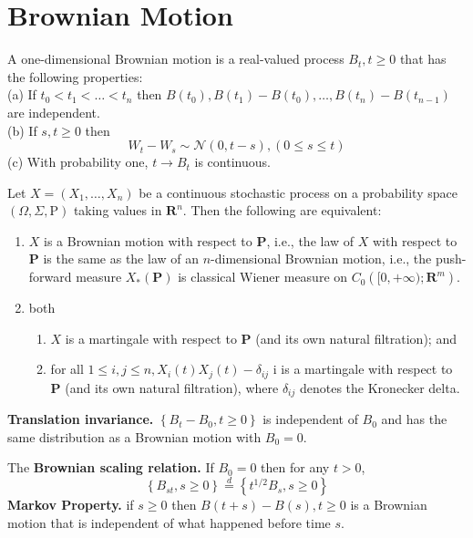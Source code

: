 
\section{Brownian Motion}
\begin{definition}
	A one-dimensional Brownian motion is a real-valued process $B_t, t \geq 0$ that has the following properties:\\
(a) If $t_0<t_1<\ldots<t_n$ then $B\left(t_0\right), B\left(t_1\right)-B\left(t_0\right), \ldots, B\left(t_n\right)-B\left(t_{n-1}\right)$ are independent.\\
(b) If $s, t \geq 0$ then
\[
W_t-W_s \sim \mathcal{N}(0, t-s),(0 \leq s \leq t)
\]
(c) With probability one, $t \rightarrow B_t$ is continuous.
\end{definition}

\begin{theorem}
	Let $X=\left(X_1, \ldots, X_n\right)$ be a continuous stochastic process on a probability space $(\Omega, \Sigma, \mathrm{P})$ taking values in $\mathbf{R}^n$. Then the following are equivalent:
\begin{enumerate}
		\item 
$X$ is a Brownian motion with respect to $\mathbf{P}$, i.e., the law of $X$ with respect to $\mathbf{P}$ is the same as the law of an $n$-dimensional Brownian motion, i.e., the push-forward measure $X_*(\mathbf{P})$ is classical Wiener measure on $C_0\left([0,+\infty) ; \mathbf{R}^m\right)$.
\item 
 both
\begin{enumerate}
 	\item 
$X$ is a martingale with respect to $\mathbf{P}$ (and its own natural filtration); and
 	\item 
for all $1 \leq i, j \leq n, X_i(t) X_j(t)-\delta_{i j}$ i is a martingale with respect to $\mathbf{P}$ (and its own natural filtration), where $\delta_{i j}$ denotes the Kronecker delta.
	\end{enumerate}
\end{enumerate}
\end{theorem}

\textbf{Translation invariance.} $\left\{B_t-B_0, t \geq 0\right\}$ is independent of $B_0$ and has the same distribution as a Brownian motion with $B_0=0$.

The \textbf{Brownian scaling relation.} If $B_0=0$ then for any $t>0$,
\[
\left\{B_{s t}, s \geq 0\right\} \stackrel{d}{=}\left\{t^{1 / 2} B_s, s \geq 0\right\}
\]
\textbf{Markov Property.} if $s \geq 0$ then $B(t+s)-B(s), t \geq 0$ is a Brownian motion that is independent of what happened before time $s$.

